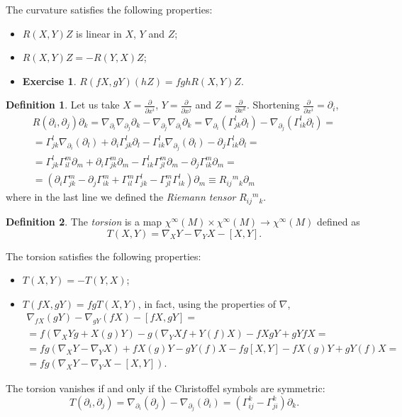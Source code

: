 \documentclass[a4paper,12pt]{book}
\theoremstyle{definition}
\newtheorem{definition}{Definition}
\newtheorem{exercise}{Exercise}
\theoremstyle{remark}
\begin{document}
The curvature satisfies the following properties:
\begin{itemize}
\item $R(X,Y)Z$ is linear in $X$, $Y$ and $Z$;
\item $R(X,Y)Z=-R(Y,X)Z$;
\item \leavevmode\par\vspace*{\dimexpr-4pt-\parskip-\baselineskip}
\begin{exercise}$R(fX,gY)(hZ)=fghR(X,Y)Z$.\end{exercise}
\end{itemize}

\begin{definition}
Let us take $X=\frac{\partial}{\partial x^i}$, $Y=\frac{\partial}{\partial x^j}$ and $Z=\frac{\partial}{\partial x^k}$. Shortening $\frac{\partial}{\partial x^i}=\partial_i$,
\begin{multline*}R(\partial_i,\partial_j)\partial_k=\nabla_{\partial_i}\nabla_{\partial_j}\partial_k-\nabla_{\partial_j}\nabla_{\partial_i}\partial_k=\nabla_{\partial_i}(\Gamma_{jk}^l\partial_l)-\nabla_{\partial_j}(\Gamma_{ik}^l\partial_l)=\\
=\Gamma_{jk}^l\nabla_{\partial_i}(\partial_l)+\partial_i\Gamma_{jk}^l\partial_l-\Gamma_{ik}^l\nabla_{\partial_j}(\partial_l)-\partial_j\Gamma_{ik}^l\partial_l=\\
=\Gamma_{jk}^l\Gamma_{il}^m\partial_m+\partial_i\Gamma_{jk}^m\partial_m-\Gamma_{ik}^l\Gamma_{jl}^m\partial_m-\partial_j\Gamma_{ik}^m\partial_m=\\
=(\partial_i\Gamma_{jk}^m-\partial_j\Gamma_{ik}^m+\Gamma_{il}^m\Gamma_{jk}^l-\Gamma_{jl}^m\Gamma_{ik}^l)\partial_m\equiv R_{ij}{}^m{}_k\partial_m\end{multline*}
where in the last line we defined the \emph{Riemann tensor} $R_{ij}{}^m{}_k$.
\end{definition}

\begin{definition}
The \emph{torsion} is a map $\chi^\infty(M)\times\chi^\infty(M)\to\chi^\infty(M)$ defined as
\[T(X,Y)=\nabla_XY-\nabla_YX-[X,Y].\]
\end{definition}
The torsion satisfies the following properties:
\begin{itemize}
\item $T(X,Y)=-T(Y,X)$;
\item $T(fX,gY)=fgT(X,Y)$, in fact, using the properties of $\nabla$,
\begin{multline*}
\nabla_{fX}(gY)-\nabla_{gY}(fX)-[fX,gY]=\\
=f(\nabla_XYg+X(g)Y)-g(\nabla_YXf+Y(f)X)-fXgY+gYfX=\\
=fg(\nabla_XY-\nabla_YX)+fX(g)Y-gY(f)X-fg[X,Y]-fX(g)Y+gY(f)X=\\
=fg(\nabla_XY-\nabla_YX-[X,Y]).
\end{multline*}
\end{itemize}
The torsion vanishes if and only if the Christoffel symbols are symmetric:
\[T(\partial_i,\partial_j)=\nabla_{\partial_i}(\partial_j)-\nabla_{\partial_j}(\partial_i)=(\Gamma_{ij}^k-\Gamma_{ji}^k)\partial_k.\]
\end{document}

